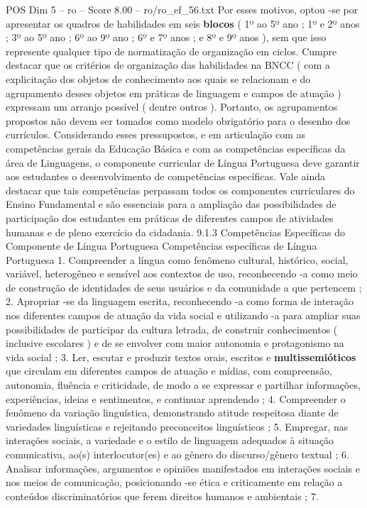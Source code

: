 \begin{textsample}{POS Dim 5 – ro – Score 8.00 – ro/ro\_ef\_56.txt}
Por esses motivos, optou -se por apresentar os quadros de habilidades em seis \textbf{blocos} ( 1º ao 5º ano ; 1º e 2º anos ; 3º ao 5º ano ; 6º ao 9º ano ; 6º e 7º anos ; e 8º e 9º anos ), sem que isso represente qualquer tipo de normatização de organização em ciclos.
Cumpre destacar que os critérios de organização das habilidades na BNCC ( com a explicitação dos objetos de conhecimento aos quais se relacionam e do agrupamento desses objetos em práticas de linguagem e campos de atuação ) expressam um arranjo possível ( dentre outros ).
Portanto, os agrupamentos propostos não devem ser tomados como modelo obrigatório para o desenho dos currículos.
Considerando esses pressupostos, e em articulação com as competências gerais da Educação Básica e com as competências específicas da área de Linguagens, o componente curricular de Língua Portuguesa deve garantir aos estudantes o desenvolvimento de competências específicas.
Vale ainda destacar que tais competências perpassam todos os componentes curriculares do Ensino Fundamental e são essenciais para a ampliação das possibilidades de participação dos estudantes em práticas de diferentes campos de atividades humanas e de pleno exercício da cidadania. 9.1.3 Competências Específicas do Componente de Língua Portuguesa Competências específicas de Língua Portuguesa 1.
Compreender a língua como fenômeno cultural, histórico, social, variável, heterogêneo e sensível aos contextos de uso, reconhecendo -a como meio de construção de identidades de seus usuários e da comunidade a que pertencem ; 2.
Apropriar -se da linguagem escrita, reconhecendo -a como forma de interação nos diferentes campos de atuação da vida social e utilizando -a para ampliar suas possibilidades de participar da cultura letrada, de construir conhecimentos ( inclusive escolares ) e de se envolver com maior autonomia e protagonismo na vida social ; 3.
Ler, escutar e produzir textos orais, escritos e \textbf{multissemióticos} que circulam em diferentes campos de atuação e mídias, com compreensão, autonomia, fluência e criticidade, de modo a se expressar e partilhar informações, experiências, ideias e sentimentos, e continuar aprendendo ; 4.
Compreender o fenômeno da variação linguística, demonstrando atitude respeitosa diante de variedades linguísticas e rejeitando preconceitos linguísticos ; 5.
Empregar, nas interações sociais, a variedade e o estilo de linguagem adequados à situação comunicativa, ao(s) interlocutor(es) e ao gênero do discurso/gênero textual ; 6.
Analisar informações, argumentos e opiniões manifestados em interações sociais e nos meios de comunicação, posicionando -se ética e criticamente em relação a conteúdos discriminatórios que ferem direitos humanos e ambientais ; 7.

\end{textsample}
